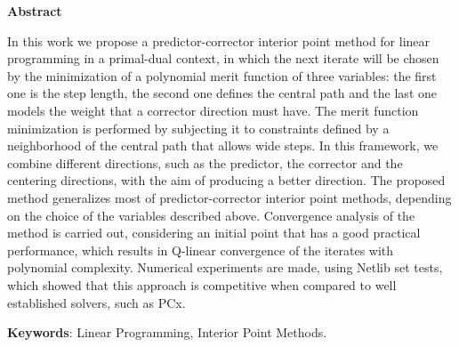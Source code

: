\begin{center}
  \large{\textbf{Abstract}}
\end{center}




In this work we propose a predictor-corrector interior point method for linear programming in a primal-dual context, in which the next iterate will be chosen by the minimization of a polynomial merit function  of three variables: the first one is the step length, the second one defines the central path and the last one models the weight that a corrector direction must have. The merit function minimization is performed by subjecting it to constraints defined by a neighborhood of the central path that allows wide steps. In this framework, we combine  different directions, such as the predictor, the corrector and the centering directions, with the aim of producing a better direction. The proposed method generalizes most of predictor-corrector interior point methods, depending on the choice of the variables described above. Convergence analysis of the method is carried out,  considering an initial point that has a good practical performance, which results in Q-linear convergence of the iterates with polynomial complexity. Numerical experiments are made, using Netlib set tests, which  showed that this approach is competitive when compared to  well established solvers, such as PCx.






\vspace{.5cm}
\textbf{Keywords}:
Linear Programming, Interior Point Methods.
